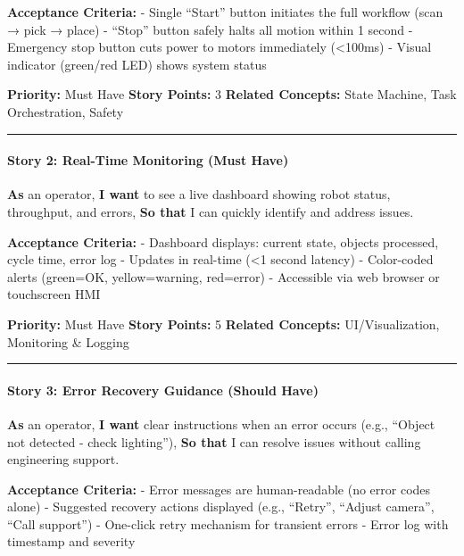 \documentclass[
]{article}
\begin{document}
\textbf{Acceptance Criteria:} - Single ``Start'' button initiates the
full workflow (scan → pick → place) - ``Stop'' button safely halts all
motion within 1 second - Emergency stop button cuts power to motors
immediately (\textless100ms) - Visual indicator (green/red LED) shows
system status

\textbf{Priority:} Must Have \textbf{Story Points:} 3 \textbf{Related
Concepts:} State Machine, Task Orchestration, Safety

\begin{center}\rule{0.5\linewidth}{0.5pt}\end{center}

\hypertarget{story-2-real-time-monitoring-must-have}{%
\paragraph{Story 2: Real-Time Monitoring (Must
Have)}\label{story-2-real-time-monitoring-must-have}}

\textbf{As} an operator, \textbf{I want} to see a live dashboard showing
robot status, throughput, and errors, \textbf{So that} I can quickly
identify and address issues.

\textbf{Acceptance Criteria:} - Dashboard displays: current state,
objects processed, cycle time, error log - Updates in real-time
(\textless1 second latency) - Color-coded alerts (green=OK,
yellow=warning, red=error) - Accessible via web browser or touchscreen
HMI

\textbf{Priority:} Must Have \textbf{Story Points:} 5 \textbf{Related
Concepts:} UI/Visualization, Monitoring \& Logging

\begin{center}\rule{0.5\linewidth}{0.5pt}\end{center}

\hypertarget{story-3-error-recovery-guidance-should-have}{%
\paragraph{Story 3: Error Recovery Guidance (Should
Have)}\label{story-3-error-recovery-guidance-should-have}}

\textbf{As} an operator, \textbf{I want} clear instructions when an
error occurs (e.g., ``Object not detected - check lighting''),
\textbf{So that} I can resolve issues without calling engineering
support.

\textbf{Acceptance Criteria:} - Error messages are human-readable (no
error codes alone) - Suggested recovery actions displayed (e.g.,
``Retry'', ``Adjust camera'', ``Call support'') - One-click retry
mechanism for transient errors - Error log with timestamp and severity
\end{document}
